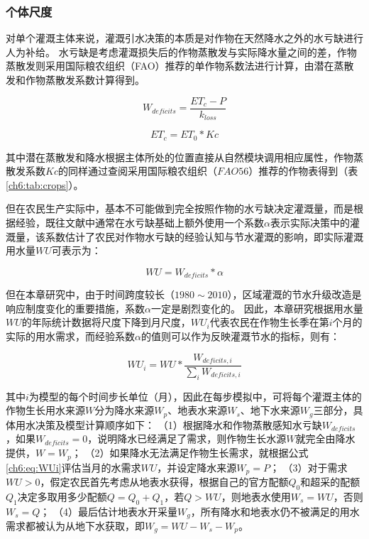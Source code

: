 \subsubsection*{个体尺度}

对单个灌溉主体来说，灌溉引水决策的本质是对作物在天然降水之外的水亏缺进行人为补给。
水亏缺是考虑灌溉损失后的作物蒸散发与实际降水量之间的差，作物蒸散发则采用国际粮农组织（FAO）推荐的单作物系数法进行计算，由潜在蒸散发和作物蒸散发系数计算得到。

\begin{equation}
    \label{ch6:eq:deficits}
    W_{deficits} = \frac{ET_c - P}{k_{loss}}
\end{equation}

\begin{equation}
    \label{ch6:eq:etc}
    ET_c = ET_{0} * Kc
\end{equation}

其中潜在蒸散发和降水根据主体所处的位置直接从自然模块调用相应属性，作物蒸散发系数$Kc$的同样通过查阅采用国际粮农组织（$FAO56$）推荐的作物表得到（表\ref{ch6:tab:crops}）。



但在农民生产实际中，基本不可能做到完全按照作物的水亏缺决定灌溉量，而是根据经验，既往文献中通常在水亏缺基础上额外使用一个系数$\alpha$表示实际决策中的灌溉量，该系数估计了农民对作物水亏缺的经验认知与节水灌溉的影响，即实际灌溉用水量$WU$可表示为：

\begin{equation}
    \label{ch6:eq:WU}
    WU = W_{deficits} * \alpha
\end{equation}

但在本章研究中，由于时间跨度较长（$1980 \sim 2010$），区域灌溉的节水升级改造是响应制度变化的重要措施，系数$\alpha$一定是剧烈变化的。
因此，本章研究根据用水量$WU$的年际统计数据将尺度下降到月尺度，$WU_i$代表农民在作物生长季在第$i$个月的实际的用水需求，而经验系数$\alpha$的值则可以作为反映灌溉节水的指标，则有：

\begin{equation}
    \label{ch6:eq:WUi}
    WU_i = WU * \frac{W_{deficits, i}}{\sum_{i} W_{deficits, i}}
\end{equation}

其中$i$为模型的每个时间步长单位（月），因此在每步模拟中，可将每个灌溉主体的作物生长用水来源$W$分为降水来源$W_p$、地表水来源$W_s$、地下水来源$W_g$三部分，具体用水决策及模型计算顺序如下：
（1）根据降水和作物蒸散感知水亏缺$W_{deficits}$，如果$W_{deficits}=0$，说明降水已经满足了需求，则作物生长水源$W$就完全由降水提供，$W=W_{p}$；
（2）如果降水无法满足作物生长需求，就根据公式\ref{ch6:eq:WUi}评估当月的水需求$WU$，并设定降水来源$W_{p} = P$；
（3）对于需求$WU > 0$，假定农民首先考虑从地表水获得，根据自己的官方配额$Q_{0}$和超采的配额$Q_{1}$决定多取用多少配额$Q = Q_{0} + Q_{1}$，若$Q > WU$，则地表水使用$W_s = WU$，否则$W_s = Q$；
（4）最后估计地表水开采量$W_g$，所有降水和地表水仍不被满足的用水需求都被认为从地下水获取，即$W_g = WU - W_s - W_p$。

